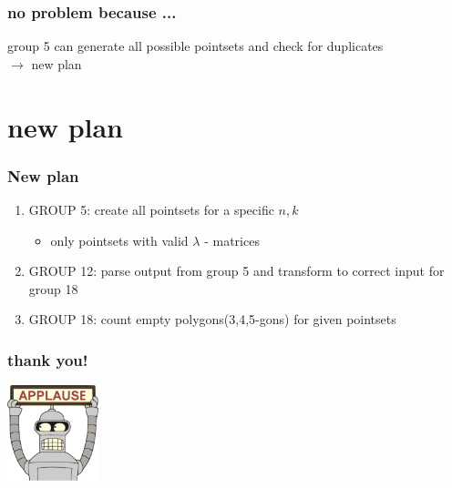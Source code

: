 \documentclass{beamer}
\begin{document}
\begin{frame}
\frametitle{no problem because ...}
group 5 can generate all possible pointsets and check for duplicates\\
$\rightarrow$ new plan
\end{frame}

\section{new plan}
\begin{frame}
\frametitle{New plan}
\begin{enumerate}
\item GROUP 5: create all pointsets for a specific $n,k$
  \begin{itemize}
  \item only pointsets with valid $\lambda$ - matrices
  \end{itemize}
\item GROUP 12: parse output from group 5 and transform to correct input for group 18
\item GROUP 18: count empty polygons(3,4,5-gons) for given pointsets



\end{enumerate}
\end{frame}


%



\begin{frame}
\frametitle{thank you!}
\begin{center}
\vspace{2em}
\includegraphics[width=100px]{bender}
\end{center}
\end{frame}
\end{document}
